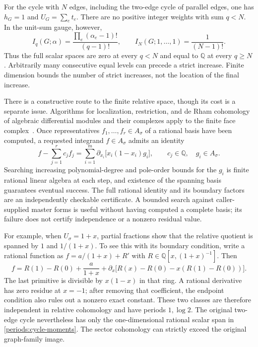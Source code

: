 \begin{example}
\label{periods:plateau}
For the cycle with $N$ edges, including the two-edge cycle of parallel
edges, one has $h_G=1$ and $U_G=\sum_e t_e$.  There are no positive
integer weights with sum $q<N$.  In the unit-sum gauge, however,
\begin{equation}
 I_q(G;\alpha)=\frac{\prod_e(\alpha_e-1)!}{(q-1)!},
 \qquad
 I_N(G;1,\ldots,1)=\frac1{(N-1)!}.
 \label{periods:cycle-moments}
\end{equation}
Thus the full scalar spaces are zero at every $q<N$ and equal to
$\mathbb Q$ at every $q\ge N$.  Arbitrarily many consecutive equal
levels can precede a strict increase.  Finite dimension bounds the
number of strict increases, not the location of the final increase.
\end{example}

There is a constructive route to the finite relative space, though its
cost is a separate issue.  Algorithms for localization, restriction, and
de Rham cohomology of algebraic differential modules and their complexes
apply to the finite face complex~\cite{oaku2001,walther2000}.  Once
representatives $f_1,\ldots,f_r\in A_\sigma$ of a rational basis have
been computed, a requested integrand $f\in A_\sigma$ admits an identity
\begin{equation}
 f-\sum_{j=1}^r c_j f_j
 =\sum_{i=1}^m\partial_{x_i}\bigl[x_i(1-x_i)g_i\bigr],
 \qquad c_j\in\mathbb Q,\quad g_i\in A_\sigma.
 \label{periods:target-certificate}
\end{equation}
Searching increasing polynomial-degree and pole-order bounds for the
$g_i$ is finite rational linear algebra at each step, and existence of
the spanning basis guarantees eventual success.  The full rational
identity and its boundary factors are an independently checkable
certificate.  A bounded search against caller-supplied master forms is
useful without having computed a complete basis; its failure does not
certify independence or a nonzero residual value.

For example, when $U_\sigma=1+x$, partial fractions show that the relative
quotient is spanned by $1$ and $1/(1+x)$.  To see this with its boundary
condition, write a rational function as $f=a/(1+x)+R'$ with
$R\in\mathbb Q[x,(1+x)^{-1}]$.  Then
\begin{equation}
 f=R(1)-R(0)+\frac{a}{1+x}
 +\partial_x\bigl[R(x)-R(0)-x(R(1)-R(0))\bigr].
 \label{periods:one-dimensional-relative}
\end{equation}
The last primitive is divisible by $x(1-x)$ in that ring.  A rational
derivative has zero residue at $x=-1$; after removing that coefficient,
the endpoint condition also rules out a nonzero exact constant.  These
two classes are therefore independent in relative cohomology and have
periods $1,\log2$.  The original two-edge cycle nevertheless has only the
one-dimensional rational scalar span in \eqref{periods:cycle-moments}.
The sector cohomology can strictly exceed the original graph-family image.

